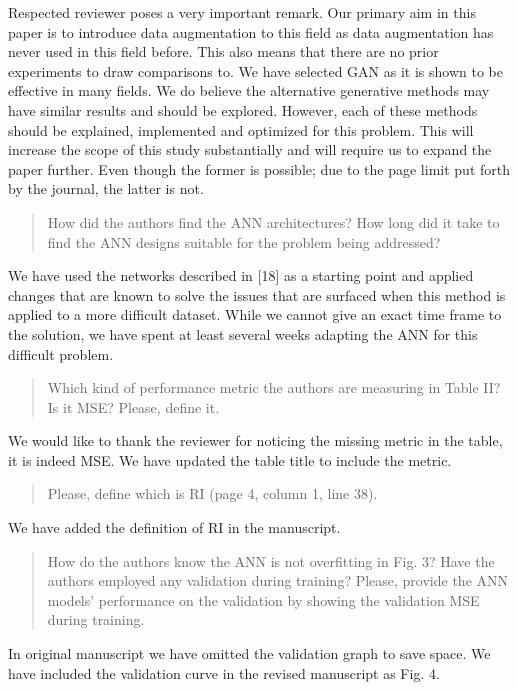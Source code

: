 \documentclass{article}
\begin{document}
	Respected reviewer poses a very important remark. Our primary aim in this paper is to introduce data augmentation to this field as data augmentation has never used in this field before. This also means that there are no prior experiments to draw comparisons to. We have selected GAN as it is shown to be effective in many fields. We do believe the alternative generative methods may have similar results and should be explored. However, each of these methods should be explained, implemented and optimized for this problem. This will increase the scope of this study substantially and will require us to expand the paper further. Even though the former is possible; due to the page limit put forth by the journal, the latter is not. 
	
	\begin{quote}
	How did the authors find the ANN architectures? How long did it take to find the ANN designs suitable for the problem being addressed?
	\end{quote}
	
	We have used the networks described in [18] as a starting point and applied changes that are known to solve the issues that are surfaced when this method is applied to a more difficult dataset. While we cannot give an exact time frame to the solution, we have spent at least several weeks adapting the ANN for this difficult problem.
	
	\begin{quote}
	Which kind of performance metric the authors are measuring in Table II? Is it MSE? Please, define it.
	\end{quote}
	
	We would like to thank the reviewer for noticing the missing metric in the table, it is indeed MSE. We have updated the table title to include the metric.
	
	\begin{quote}
	Please, define which is RI (page 4, column 1, line 38).
	\end{quote}
	
	We have added the definition of RI in the manuscript.
	
	\begin{quote}
	How do the authors know the ANN is not overfitting in Fig. 3? Have the authors employed any validation during training? Please, provide the ANN models' performance on the validation by showing the validation MSE during training.
	\end{quote}
	
	In original manuscript we have omitted the validation graph to save space. We have included the validation curve in the revised manuscript as Fig. 4.
	
\end{document}
